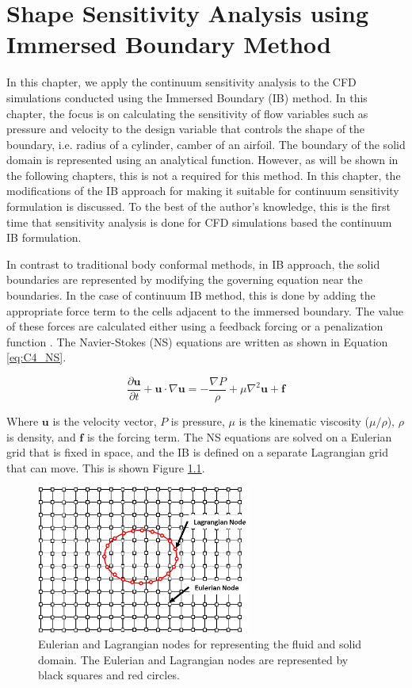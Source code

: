 \chapter{Shape Sensitivity Analysis using Immersed Boundary Method}\label{ch:shapeSenwithIB}
In this chapter, we apply the continuum sensitivity analysis to the CFD simulations conducted using the Immersed Boundary (IB) method. In this chapter, the focus is on calculating the sensitivity of flow variables such as pressure and velocity to the design variable that controls the shape of the boundary, i.e. radius of a cylinder, camber of an airfoil. The boundary of the solid domain is represented using an analytical function. However, as will be shown in the following chapters, this is not a required for this method. In this chapter, the modifications of the IB approach for making it suitable for continuum sensitivity formulation is discussed. To the best of the author's knowledge, this is the first time that sensitivity analysis is done for CFD simulations based the continuum IB formulation.

In contrast to traditional body conformal methods, in IB approach, the solid boundaries are represented by modifying the governing equation near the boundaries. In the case of continuum IB method, this is done by adding the appropriate force term to the cells adjacent to the immersed boundary. The value of these forces are calculated either using a feedback forcing \cite{goldstein1993modeling} or a penalization function \cite{arquis1984conditions}. The Navier-Stokes (NS) equations are written as shown in Equation \eqref{eq:C4_NS}.

\begin{equation}\label{eq:C4_NS}
    \frac{\partial \mathbf{u}}{\partial t} + \mathbf{u} \cdot \nabla \mathbf{u} = 
    -\frac{\nabla P}{\rho} + \mu \nabla^2 \mathbf{u} + \mathbf{f}
\end{equation}

Where $\mathbf{u}$ is the velocity vector, $P$ is pressure, $\mu$ is the kinematic viscosity ($\mu / \rho$), $\rho$ is density, and $\mathbf{f}$ is the forcing term. The NS equations are solved on a Eulerian grid that is fixed in space, and the IB is defined on a separate Lagrangian grid that can move. This is shown Figure \ref{fig:C4_lagrangianAndEulerianDomain}.

\begin{figure}[H]
    \centering
    \includegraphics[width=7.00cm]{Chapter_4/figure/lagrangian_and_eulerian_nodes.jpg}
    \caption{Eulerian and Lagrangian nodes for representing the fluid and solid domain. The Eulerian and Lagrangian nodes are represented by black squares and red circles.}
    \label{fig:C4_lagrangianAndEulerianDomain}
\end{figure}


